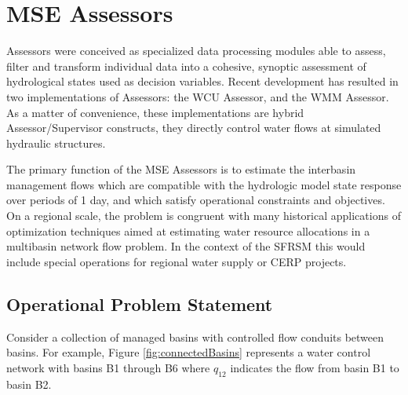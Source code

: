 \section{MSE Assessors}

Assessors were conceived as specialized data processing modules able
to assess, filter and transform individual data into a cohesive,
synoptic assessment of hydrological states used as decision
variables. Recent development has resulted in two implementations of
Assessors: the WCU Assessor, and the WMM Assessor. As a matter of
convenience, these implementations are hybrid Assessor/Supervisor
constructs, they directly control water flows at simulated hydraulic
structures.

The primary function of the MSE Assessors is to estimate the
interbasin management flows which are compatible with the hydrologic
model state response over periods of 1 day, and which satisfy
operational constraints and objectives.  On a regional scale, the
problem is congruent with many historical applications of optimization
techniques aimed at estimating water resource allocations in a
multibasin network flow problem. In the context of the SFRSM this
would include special operations for regional water supply or CERP
projects. 

\subsection{Operational Problem Statement}

Consider a collection of managed basins with controlled flow conduits
between basins. For example, Figure \ref{fig:connectedBasins}
represents a water control network with basins B1 through B6 where
$q_{12}$ indicates the flow from basin B1 to basin B2.


